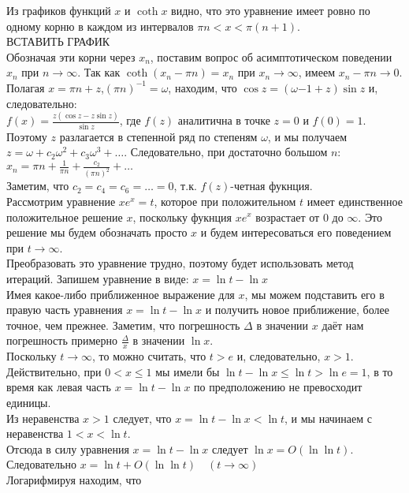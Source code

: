 \documentclass{report}
\begin{document}
Из графиков функций $x$ и $\coth{x}$ видно, что это уравнение имеет ровно по одному корню в каждом из интервалов $\pi{n}<x<\pi{(n+1)}$. \\
ВСТАВИТЬ ГРАФИК\\
Обозначая эти корни через $x_n$, поставим вопрос об асимптотическом поведении $x_n$ при $n\to\infty$. Так как $\coth{(x_n-\pi{n})}=x_n$ при $x_n\to\infty$, имеем $x_n-\pi{n}\to{0}$.
Полагая $x=\pi{n}+z$,$(\pi{n})^{-1}=\omega$, находим, что $\cos{z}=(\omega{-1}+z)\sin{z}$ и, следовательно: \\
$f(x)=\frac{z(\cos{z}-z\sin{z})}{\sin{z}}$, где $f(z)$ аналитична в точке $z=0$ и $f(0)=1$. \\
Поэтому $z$ разлагается в степенной ряд по степеням $\omega$, и мы получаем $z=\omega+c_2\omega^{2}+c_3\omega^{3}+\dots$. Следовательно, при достаточно большом $n$: \\
$x_n=\pi{n}+\frac{1}{\pi{n}}+\frac{c_2}{(\pi{n})^{2}}+\dots$ \\
Заметим, что $c_2=c_4=c_6=\dots=0$, т.к. $f(z)$-четная фукнция. \\
Рассмотрим уравнение $xe^{x}=t$, которое при положительном $t$ имеет единственное положительное решение $x$, поскольку фукнция $xe^{x}$ возрастает от $0$ до $\infty$. Это решение мы будем
обозначать просто $x$ и будем интересоваться его поведением при $t\to\infty$. \\
Преобразовать это уравнение трудно, поэтому будет использовать метод итераций. Запишем уравнение в виде: $x=\ln{t}-\ln{x}$ \\
Имея какое-либо приближенное выражение для $x$, мы можем подставить его в правую часть уравнения $x=\ln{t}-\ln{x}$ и получить новое приближение, более точное, чем прежнее. Заметим, что
погрешность $\varDelta$ в значении $x$ даёт нам погрешность примерно $\frac{\varDelta}{x}$ в значении $\ln{x}$. \\
Поскольку $t\to\infty$, то можно считать, что $t>e$ и, следовательно, $x>1$. Действительно, при $0<x\le{1}$ мы имели бы $\ln{t}-\ln{x}\le{\ln{t}}>\ln{e}=1$, в то время как левая часть $x=\ln{t}-\ln{x}$
по предположению не превосходит единицы. \\
Из неравенства $x>1$ следует, что $x=\ln{t}-\ln{x}<\ln{t}$, и мы начинаем с неравенства $1<x<\ln{t}$. \\
Отсюда в силу уравнения $x=\ln{t}-\ln{x}$ следует $\ln{x}=O(\ln\ln{t})$. \\
Следовательно $x=\ln{t}+O(\ln\ln{t})\quad(t\to\infty)$ \\
Логарифмируя находим, что \\
\end{document}
